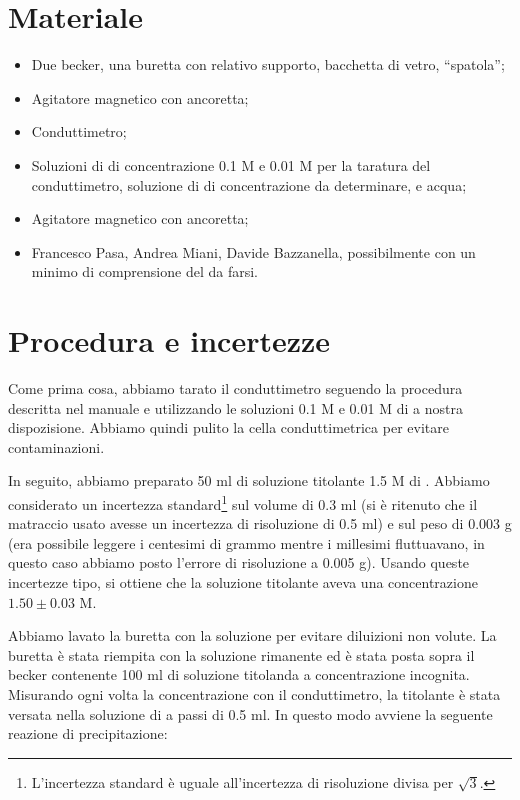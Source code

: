 \section*{Materiale}

\begin{itemize}
        \setlength{\parskip}{-1pt}
        \item{Due becker, una buretta con relativo supporto, bacchetta di vetro, ``spatola'';}
        \item{Agitatore magnetico con ancoretta;}
        \item{Conduttimetro;}
        \item{Soluzioni di  di concentrazione 0.1 M e 0.01 M per la taratura del conduttimetro,
                soluzione di  di concentrazione da determinare,  e acqua;}
        \item{Agitatore magnetico con ancoretta;}
        \item{Francesco Pasa, Andrea Miani, Davide Bazzanella, possibilmente con un minimo di comprensione
                del da farsi.}
\end{itemize}

\section*{Procedura e incertezze}

Come prima cosa, abbiamo tarato il conduttimetro seguendo la procedura descritta nel manuale e utilizzando
le soluzioni 0.1 M e 0.01 M di  a nostra dispozisione. Abbiamo quindi pulito la cella conduttimetrica per evitare contaminazioni.

In seguito, abbiamo preparato 50 ml di soluzione titolante 1.5 M di . Abbiamo considerato un
incertezza standard\footnote{L'incertezza standard è uguale all'incertezza di risoluzione divisa per $\sqrt{3}$.} sul volume di 0.3 ml 
(si è ritenuto che il matraccio usato avesse un incertezza di risoluzione di 0.5 ml)
e sul peso di 0.003 g (era possibile leggere i centesimi di grammo mentre i millesimi fluttuavano, in questo caso abbiamo posto l'errore di risoluzione a 0.005 g).
Usando queste incertezze tipo, si ottiene che la soluzione titolante aveva una concentrazione $1.50 \pm 0.03$ M.

Abbiamo lavato la buretta con la soluzione per evitare diluizioni non volute. La buretta è stata riempita con
la soluzione rimanente ed è stata posta sopra il becker contenente 100 ml di soluzione titolanda a concentrazione incognita.
Misurando ogni volta la concentrazione con il conduttimetro, la titolante è stata versata nella soluzione di 
a passi di 0.5 ml. In questo modo avviene la seguente reazione di precipitazione:

